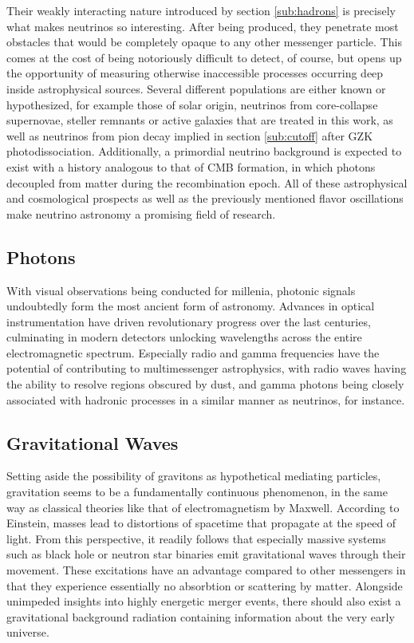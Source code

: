 Their weakly interacting nature introduced by section \ref{sub:hadrons} is precisely what makes neutrinos so interesting. After
being produced, they penetrate most obstacles that would be completely opaque to any other messenger particle. This comes at the
cost of being notoriously difficult to detect, of course, but opens up the opportunity of measuring otherwise inaccessible processes
occurring deep inside astrophysical sources. Several different populations are either known or hypothesized, for example
those of solar origin, neutrinos from core-collapse supernovae, steller remnants or active galaxies that are treated in this work,
as well as neutrinos from pion decay implied in section \ref{sub:cutoff} after GZK photodissociation. Additionally, a primordial
neutrino background is expected to exist with a history analogous to that of CMB formation, in which photons decoupled
from matter during the recombination epoch. All of these astrophysical and cosmological prospects as well as the previously
mentioned flavor oscillations make neutrino astronomy a promising field of research.



\subsection{Photons}
\label{sub:photons}

With visual observations being conducted for millenia, photonic signals undoubtedly form the most ancient form of astronomy.
Advances in optical instrumentation have driven revolutionary progress over the last centuries, culminating in modern detectors
unlocking wavelengths across the entire electromagnetic spectrum. Especially radio and gamma frequencies have the potential of
contributing to multimessenger astrophysics, with radio waves having the ability to resolve regions obscured by dust, and gamma
photons being closely associated with hadronic processes in a similar manner as neutrinos, for instance.



\subsection{Gravitational Waves}
\label{sub:gravitational}

Setting aside the possibility of gravitons as hypothetical mediating particles, gravitation seems to be a fundamentally continuous
phenomenon, in the same way as classical theories like that of electromagnetism by Maxwell. According to Einstein, masses lead to
distortions of spacetime that propagate at the speed of light. From this perspective, it readily follows that especially massive
systems such as black hole or neutron star binaries emit gravitational waves through their movement. These excitations have an
advantage compared to other messengers in that they experience essentially no absorbtion or scattering by matter. Alongside unimpeded
insights into highly energetic merger events, there should also exist a gravitational background radiation containing information about
the very early universe.



